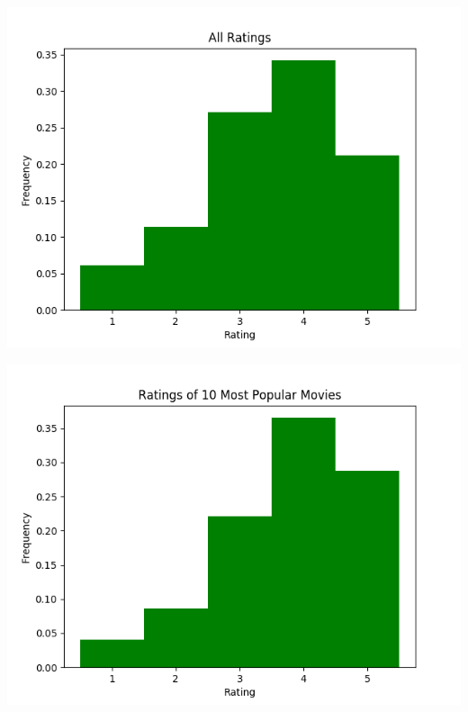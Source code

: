 \begin{appendices}
\begin{center}
  \begin{minipage}{0.49\linewidth}
    \includegraphics[scale=0.5]{"All Ratings"}
    \captionsetup{width=.75\linewidth}
  \end{minipage}
  \begin{minipage}{0.49\linewidth}
    \includegraphics[scale=0.5]{"Ratings of 10 Most Popular Movies"}
    \captionsetup{width=.75\linewidth}
  \end{minipage}
  \begin{minipage}{0.49\linewidth}

\end{minipage}
\end{center}
\end{appendices}
